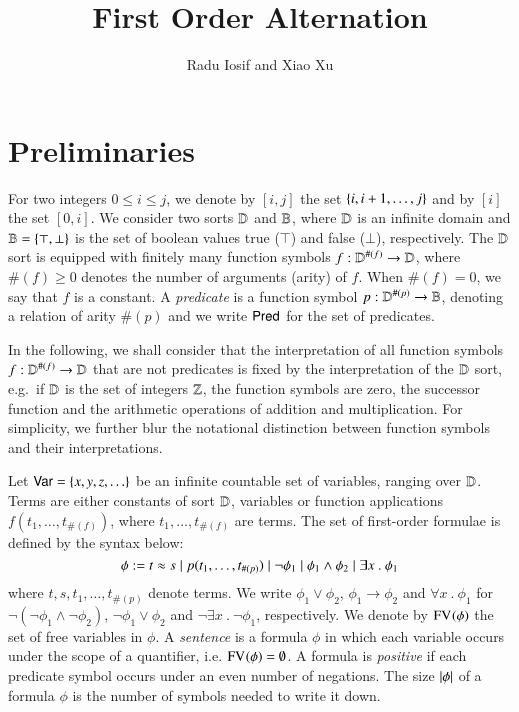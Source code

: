 \documentclass{llncs}
\begin{document}

\title{First Order Alternation}

\author{Radu Iosif and Xiao Xu}

\maketitle

\begin{abstract}
\end{abstract}

\section{Preliminaries}

For two integers $0 \leq i \leq j$, we denote by $[i,j]$ the set
$\{ i,i+1,\ldots,j \}$ and by $[i]$ the set $[0,i]$. We consider two
sorts $\mathbb{D}$ and $\mathbb{B}$, where $\mathbb{D}$ is an infinite domain and
$\mathbb{B} = \{ \top,\bot \}$ is the set of boolean values true ($\top$)
and false ($\bot$), respectively. The $\mathbb{D}$ sort is equipped with
finitely many function symbols $f : \mathbb{D}^{\#(f)} \rightarrow \mathbb{D}$,
where $\#(f)\geq0$ denotes the number of arguments (arity) of
$f$. When $\#(f)=0$, we say that $f$ is a constant. A \emph{predicate}
is a function symbol $p : \mathbb{D}^{\#(p)} \rightarrow \mathbb{B}$, denoting a
relation of arity $\#(p)$ and we write $\mathsf{Pred}$ for the set of
predicates. 

In the following, we shall consider that the interpretation of all
function symbols $f : \mathbb{D}^{\#(f)} \rightarrow \mathbb{D}$ that are not
predicates is fixed by the interpretation of the $\mathbb{D}$ sort,
e.g.\ if $\mathbb{D}$ is the set of integers ${\bf \mathbb{Z}}$, the function symbols
are zero, the successor function and the arithmetic operations of
addition and multiplication. For simplicity, we further blur the
notational distinction between function symbols and their
interpretations.

Let $\mathsf{Var} = \{ x,y,z,\ldots \}$ be an infinite countable set of
variables, ranging over $\mathbb{D}$. Terms are either constants of sort
$\mathbb{D}$, variables or function applications $f(t_1,\ldots,t_{\#(f)})$,
where $t_1,\ldots,t_{\#(f)}$ are terms. The set of first-order
formulae is defined by the syntax below:
\[\phi := t \approx s \mid p(t_1,\ldots,t_{\#(p)}) 
\mid \neg \phi_1 \mid \phi_1 \wedge \phi_2 \mid \exists x ~.~
\phi_1 \] where $t,s,t_1,\ldots,t_{\#(p)}$ denote terms. We write
$\phi_1 \vee \phi_2$, $\phi_1 \rightarrow \phi_2$ and $\forall x ~.~
\phi_1$ for $\neg(\neg\phi_1 \wedge \neg\phi_2)$, $\neg\phi_1 \vee
\phi_2$ and $\neg\exists x ~.~ \neg\phi_1$, respectively. We denote by
$\mathrm{FV}_{}(\phi)$ the set of free variables in $\phi$. A \emph{sentence}
is a formula $\phi$ in which each variable occurs under the scope of a
quantifier, i.e. $\mathrm{FV}_{}(\phi) = \emptyset$. A formula is
\emph{positive} if each predicate symbol occurs under an even number
of negations. The size ${|{\phi}|}$ of a formula $\phi$ is the number
of symbols needed to write it down.
\end{document}
